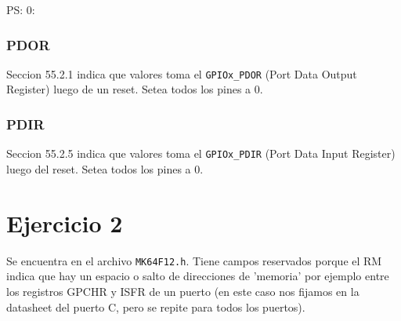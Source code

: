 \documentclass[10pt,a4paper]{article}
\begin{document}
PS:
0:

\subsubsection{PDOR}

Seccion 55.2.1 indica que valores toma el \texttt{GPIOx\_PDOR} (Port Data Output Register) luego de un reset. Setea todos los pines a 0.

\subsubsection{PDIR}
Seccion 55.2.5 indica que valores toma el \texttt{GPIOx\_PDIR} (Port Data Input Register) luego del reset. Setea todos los pines a 0.

\section{Ejercicio 2}
Se encuentra en el archivo \texttt{MK64F12.h}. 
Tiene campos reservados porque el RM indica que hay un espacio o salto de direcciones de 'memoria' por ejemplo entre los registros GPCHR y ISFR de un puerto (en este caso nos fijamos en la datasheet del puerto C, pero se repite para todos los puertos).
\end{document}
